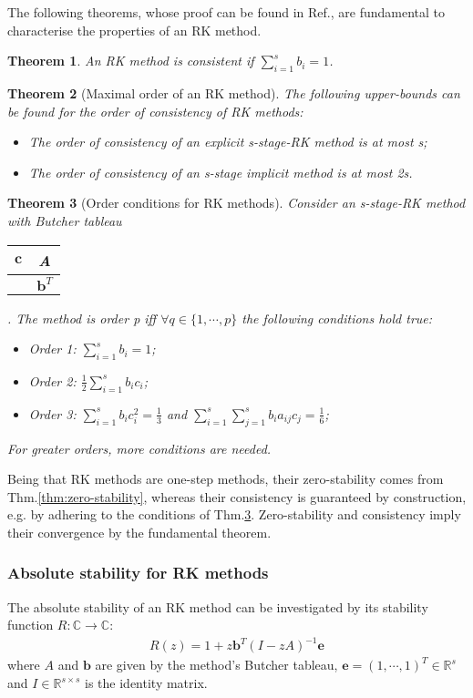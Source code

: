 \documentclass[11pt]{article}
\theoremstyle{theorem}
\newtheorem{theorem}{Theorem}
\theoremstyle{definition}
\begin{document}
The following theorems, whose proof can be found in Ref.\cite{lec-notes}, are fundamental to characterise the properties of an RK method.\\

\begin{theorem}
	\label{thm:consistency-RK}
	An RK method is consistent if $\sum_{i=1}^{s}b_i=1$.
\end{theorem}

\begin{theorem}[Maximal order of an RK method]
	\label{thm:order-RK}
	The following upper-bounds can be found for the order of consistency of RK methods:
	\begin{itemize}
		\item The order of consistency of an explicit s-stage-RK method is at most s;
		\item The order of consistency of an s-stage implicit method is at most 2s.
	\end{itemize}
\end{theorem}

\begin{theorem}[Order conditions for RK methods]
	\label{thm:order-cond-RK}
	Consider an s-stage-RK method with Butcher tableau 
	\begin{tabular}{c|c}
		$\mathbf{c}$ & A  \\
		\hline
		& $\mathbf{b}^T$ \\
	\end{tabular}
	. The method is order p iff $\forall q\in\lbrace 1,\cdots, p\rbrace$ the following conditions hold true:
	\begin{itemize}
		\item Order 1: $\sum_{i=1}^{s}b_i=1$;
		\item Order 2: $\frac{1}{2}\sum_{i=1}^{s}b_ic_i$;
		\item Order 3: $\sum_{i=1}^{s}b_ic_i^2=\frac{1}{3}$ and $\sum_{i=1}^{s}\sum_{j=1}^{s}b_ia_{ij}c_j=\frac{1}{6}$;
	\end{itemize}
	For greater orders, more conditions are needed.\\
\end{theorem}

Being that RK methods are one-step methods, their zero-stability comes from Thm.\ref{thm:zero-stability}, whereas their consistency is guaranteed by construction,
e.g. by adhering to the conditions of Thm.\ref{thm:order-cond-RK}. Zero-stability and consistency imply their convergence by the fundamental theorem.\\
\subsubsection{Absolute stability for RK methods}
The absolute stability of an RK method can be investigated by its stability function
$R:\mathbb{C}\rightarrow\mathbb{C}$:
\begin{align}
	\label{eqn:R}
	R(z)= 1+z\mathbf{b}^T(I-zA)^{-1}\mathbf{e}
\end{align}
where $A$ and $\mathbf{b}$ are given by the method's Butcher tableau, $\mathbf{e}=(1,\cdots, 1)^T\in\mathbb{R}^s$ and $I\in\mathbb{R}^{s\times s}$ is the identity matrix.
\end{document}
